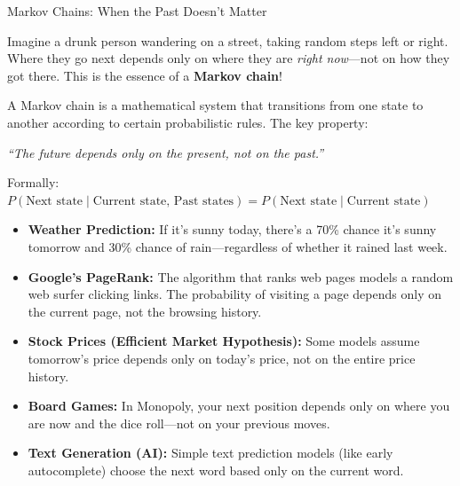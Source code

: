 \begin{funfactsbreak}{Markov Chains: When the Past Doesn't Matter}


Imagine a drunk person wandering on a street, taking random steps left or right. Where they go next depends only on where they are \textit{right now}—not on how they got there. This is the essence of a \textbf{Markov chain}!


A Markov chain is a mathematical system that transitions from one state to another according to certain probabilistic rules. The key property:
\begin{center}
\textit{``The future depends only on the present, not on the past.''}
\end{center}

Formally: $P(\text{Next state} \mid \text{Current state, Past states}) = P(\text{Next state} \mid \text{Current state})$


\begin{itemize}
    \item \textbf{Weather Prediction:} If it's sunny today, there's a 70\% chance it's sunny tomorrow and 30\% chance of rain—regardless of whether it rained last week.

    \item \textbf{Google's PageRank:} The algorithm that ranks web pages models a random web surfer clicking links. The probability of visiting a page depends only on the current page, not the browsing history.

    \item \textbf{Stock Prices (Efficient Market Hypothesis):} Some models assume tomorrow's price depends only on today's price, not on the entire price history.

    \item \textbf{Board Games:} In Monopoly, your next position depends only on where you are now and the dice roll—not on your previous moves.

    \item \textbf{Text Generation (AI):} Simple text prediction models (like early autocomplete) choose the next word based only on the current word.
\end{itemize}



\end{funfactsbreak}
